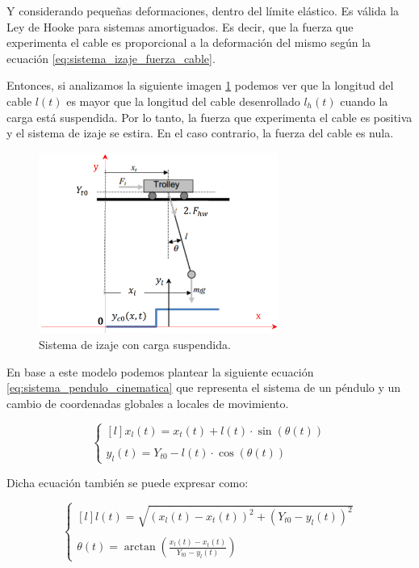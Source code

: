 \documentclass[11pt]{article}
\begin{document}
Y considerando pequeñas deformaciones, dentro del límite elástico. Es válida la Ley de Hooke para sistemas amortiguados. Es decir, que la fuerza que experimenta el cable es proporcional a la deformación del mismo según la ecuación \ref{eq:sistema_izaje_fuerza_cable}.

Entonces, si analizamos la siguiente imagen \ref{fig:sistema_pendulo} podemos ver que la longitud del cable $l(t)$ es mayor que la longitud del cable desenrollado $l_{h}(t)$ cuando la carga está suspendida. Por lo tanto, la fuerza que experimenta el cable es positiva y el sistema de izaje se estira. En el caso contrario, la fuerza del cable es nula.

\begin{figure}[h!]
	\centering
	\includegraphics[width=0.7\textwidth]{images/imagen_7_sistema_pendulo.png}
	\caption{Sistema de izaje con carga suspendida.}
	\label{fig:sistema_pendulo}
\end{figure}

\newpage

En base a este modelo podemos plantear la siguiente ecuación \ref{eq:sistema_pendulo_cinematica} que representa el sistema de un péndulo y un cambio de coordenadas globales a locales de movimiento.

\begin{equation}
	\label{eq:sistema_pendulo_cinematica}
	\left\{
		\begin{matrix*}[l]
		x_{l}(t)=x_{t}(t) + l(t)\cdot \sin(\theta(t))
		\\
		\\ 
		y_{l}(t)=Y_{t0} - l(t)\cdot \cos(\theta(t))
		\end{matrix*}
	\right.
\end{equation}

Dicha ecuación también se puede expresar como:

\begin{equation}
	\label{eq:sistema_pendulo_cinematica_raiz_tangente}
	\left\{
		\begin{matrix*}[l]
		l(t)=\sqrt{\left ( x_{l}(t)-x_{t}(t) \right )^{2}+\left ( Y_{t0}-y_{l}(t) \right )^{2}}
		\\
		\\ 
		\theta(t)=\arctan \left ( \frac{x_{l}(t)-x_{t}(t)}{Y_{t0}-y_{l}(t)} \right )
		\end{matrix*}
	\right.
\end{equation}
\end{document}
